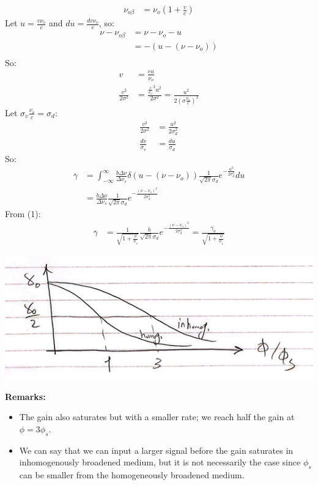 \documentclass[11pt]{article}
\begin{document}
\begin{align*}
    \nu_{o \beta} &= \nu_o (1 +\frac{v}{c})
\end{align*}
Let $u = \frac{v \nu_o}{c}$ and $du = \frac{dv \nu_o}{c}$, so:
\begin{align*}
    \nu - \nu_{o \beta} &= \nu - \nu_o - u \\
    &= -(u - (\nu - \nu_o)) \\
\end{align*}
So:
\begin{align*}
    v &= \frac{cu}{\nu_o} \\
    \frac{v^2}{2 \sigma^2} &= \frac{\frac{c}{\nu_o}^2 u^2}{2 \sigma^2} = \frac{u^2}{2 \left(\sigma \frac{\nu_o}{c}\right)^2}
\end{align*}
Let $\sigma_v \frac{\nu_o}{c} = \sigma_d$:
\begin{align*}
    \frac{v^2}{2 \sigma^2} &= \frac{u^2}{2 \sigma_d^2} \\
    \frac{dv}{\sigma_v} &= \frac{du}{\sigma_d}
\end{align*}
So:
\begin{align*}
    \overline{\gamma} &= \int_{-\infty}^{\infty} \frac{b \Delta \nu}{\Delta \nu_s} \delta(u - (\nu - \nu_o)) \frac{1}{\sqrt{2 \pi} \sigma_d} e^{-\frac{u^2}{2 \sigma_d^2}} du \\
    &= \frac{b \Delta \nu}{\Delta \nu_s} \frac{1}{\sqrt{2 \pi} \sigma_d} e^{-\frac{(\nu - \nu_o)^2}{2 \sigma_d^2}}
\end{align*}
From (1):
\begin{align*}
    \overline{\gamma} &= \frac{1}{\sqrt{1 + \frac{\phi}{\phi_s}}} \frac{b}{\sqrt{2 \pi} \sigma_d} e^{-\frac{(\nu - \nu_o)^2}{2 \sigma_d^2}} = \frac{\overline{\gamma_o}}{\sqrt{1 + \frac{\phi}{\phi_s}}}
\end{align*}
\begin{center}
    \includegraphics[scale=1]{5.png}
\end{center}
\textbf{Remarks:}
\begin{itemize}
    \item The gain also saturates but with a smaller rate; we reach half the gain at $\phi = 3 \phi_s$.
    \item We can say that we can input a larger signal before the gain saturates in inhomogenously broadened medium, but it is not necessarily the case since $\phi_s$ can be smaller from the homogeneously broadened medium.
\end{itemize}
\end{document}
